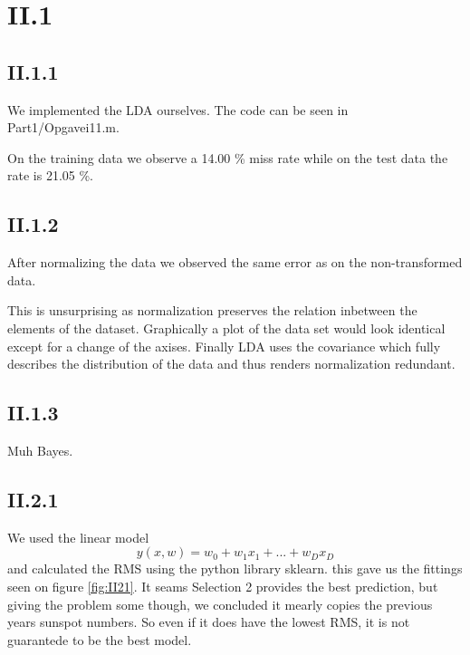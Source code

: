 \documentclass{article}
\begin{document}
\section{II.1}

\subsection{II.1.1}

We implemented the LDA ourselves. The code can be seen in
Part1/Opgavei11.m. 

On the training data we observe a 14.00 \% miss rate while on the test data
the rate is 21.05 \%.

\subsection{II.1.2}

After normalizing the data we observed the same error as on the
non-transformed data. 

This is unsurprising as normalization preserves the relation inbetween
the elements of the dataset. Graphically a plot of the data set would
look identical except for a change of the axises. Finally LDA uses the
covariance which fully describes the distribution of the data and thus
renders normalization redundant.

\subsection{II.1.3}

Muh Bayes.

\newpage
\subsection{II.2.1}

We used the linear model
\begin{equation}
    y(x, w) = w_0 + w_1 x_1 + ... + w_D x_D
\end{equation}
and calculated the RMS using the python library sklearn. this gave us the fittings seen on 
figure \ref{fig:II21}. It seams Selection 2 provides the best prediction, but giving the problem some though, we concluded it mearly copies
the previous years sunspot numbers. So even if it does have the lowest RMS, it is not guarantede to be the best model.
\end{document}
